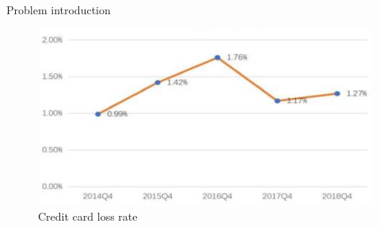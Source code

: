 \documentclass[compress,xcolor=table,hyperref]{beamer}
\begin{document}
\begin{frame}{Problem introduction}
\begin{center}
\begin{minipage}{0.45\linewidth}
		\begin{figure}[h]
			\centering
			\includegraphics[width=0.9\linewidth]{images/fig2}
			\caption{Credit card loss rate}
			\label{fig:fig1}
		\end{figure}
	\end{minipage}
\end{center}
\end{frame}
\end{document}
